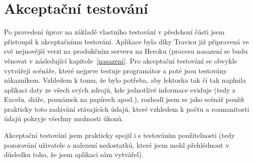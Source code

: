     \section{Akceptační testování}
    Po provedení úprav na základě vlastního testování v předchozí části jsem přistoupil k akceptačnímu testování. Aplikace byla díky Travisu již připravená ve své nejnovější verzi na produkčním serveru na Heroku (procesu nasazení se budu věnovat v následující kapitole~\ref{nasazeni}. Pro akceptační testování se obvykle vytvářejí scénáře, které nejprve testuje programátor a poté jsou testovány zákazníkem. Vzhledem k tomu, že bylo potřeba, aby lektorka tak či tak naplnila aplikaci daty ze všech svých zdrojů, kde jednotlivé informace eviduje (tedy z Excelu, diáře, poznámek na papírech apod.), rozhodl jsem se jako scénář použít prakticky toto zadávání stávajících údajů, které vzhledem k počtu a rozmanitosti údajů pokryje všechny možnosti úkonů.
    
    Akceptační testování jsem prakticky spojil i s testováním použitelnosti (tedy pozorování uživatele a nalezení nedostatků, které jsem mohl přehlédnout v důsledku toho, že jsem aplikaci sám vytvářel).
    
